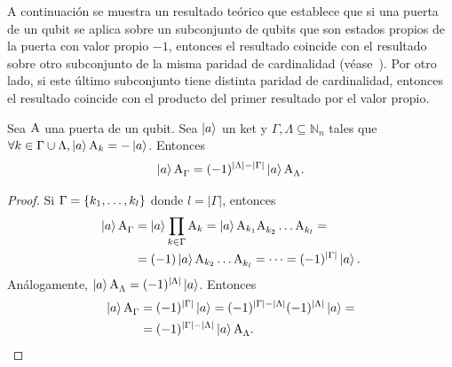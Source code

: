 	A continuación se muestra un resultado teórico que establece que si una puerta de un qubit se aplica sobre un subconjunto de qubits que son estados propios de la puerta con valor propio $-1$, entonces el resultado coincide con el resultado sobre otro subconjunto de la misma paridad de cardinalidad (véase~\cite{NielsenChuang}). Por otro lado, si este último subconjunto tiene distinta paridad de cardinalidad, entonces el resultado coincide con el producto del primer resultado por el valor propio.
	\begin{proposition}
		Sea $\text{A}$ una puerta de un qubit. Sea $\ket{a}$ un ket y $\Gamma, \Lambda \subseteq \mathbb{N}_n$ tales que $\forall k \in \Gamma \cup \Lambda, \ket{a} \text{A}_{k} = -\ket{a}$. Entonces
		\begin{equation}
			\ket{a} \text{A}^{}_{\Gamma} = (-1)^{|\Lambda|-|\Gamma|}\ket{a} \text{A}^{}_{\Lambda}.
		\end{equation}
	\end{proposition}
	\begin{proof}
		Si $\Gamma=\{k_1,\dots,k_l\}$ donde $l=|\Gamma|$, entonces
		\begin{align*}
			\ket{a} \text{A}^{}_{\Gamma} &= \ket{a} \prod_{k \in \Gamma} \text{A}_k = \ket{a}\text{A}_{k_1} \text{A}^{}_{k_2}\dots\text{A}^{}_{k_l} =\\
			&= (-1)\ket{a}\text{A}_{k_2}\dots\text{A}^{}_{k_l} =\dots = (-1)^{|\Gamma|} \ket{a}.
		\end{align*}
		Análogamente, $\ket{a} \text{A}^{}_{\Lambda} = (-1)^{|\Lambda|} \ket{a}$.
		Entonces
		\begin{align*}
			\ket{a} \text{A}^{}_{\Gamma} &= (-1)^{|\Gamma|} \ket{a} = (-1)^{|\Gamma|-|\Lambda|}(-1)^{|\Lambda|} \ket{a}=\\
			&=(-1)^{|\Gamma|-|\Lambda|}\ket{a} \text{A}^{}_{\Lambda}.
		\end{align*}
	\end{proof}

